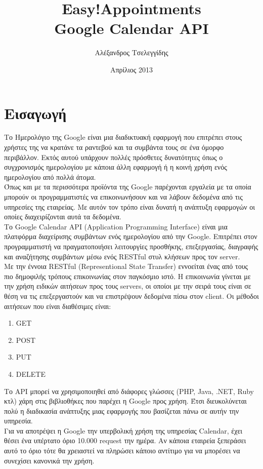 \documentclass[12pt]{article}
\title{{\Huge {\bf Easy!Appointments}} \\[0.3cm] Google Calendar API}
\author{Αλέξανδρος Τσελεγγίδης}
\date{Απρίλιος 2013}
\begin{document}
\maketitle 
\thispagestyle{empty} %

\section {Εισαγωγή}
Το Ημερολόγιο της Google είναι μια διαδικτυακή εφαρμογή που επιτρέπει στους χρήστες της να κρατάνε τα ραντεβού και τα συμβάντα τους σε ένα όμορφο περιβάλλον. Εκτός αυτού υπάρχουν πολλές πρόσθετες δυνατότητες όπως ο συγχρονισμός ημερολογίου με κάποια άλλη εφαρμογή ή η κοινή χρήση ενός ημερολογίου από πολλά άτομα.
\\[0.3cm]
Όπως και με τα περισσότερα προϊόντα της Google παρέχονται εργαλεία με τα οποία μπορούν οι προγραμματιστές να επικοινωνήσουν και να λάβουν δεδομένα από τις υπηρεσίες της εταιρείας. Με αυτόν τον τρόπο είναι δυνατή η ανάπτυξη εφαρμογών οι οποίες διαχειρίζονται αυτά τα δεδομένα.
\\[0.3cm]
Το Google Calendar API (Application Programming Interface) είναι μια πλατφόρμα διαχείρισης συμβάντων ενός ημερολογίου από την Google. Επιτρέπει στον προγραμματιστή να πραγματοποιήσει λειτουργίες προσθήκης, επεξεργασίας, διαγραφής και αναζήτησης συμβάντων μέσω ενός RESTful στυλ κλήσεων προς τον server.
\\[0.3cm]
Με την έννοια RESTful (Representional State Transfer)  εννοείται ένας από τους πιο δημοφιλής τρόπους επικοινωνίας στον παγκόσμιο ιστό. Η επικοινωνία γίνεται με την χρήση ειδικών αιτήσεων προς τους servers, οι οποίοι με την σειρά τους είναι σε θέση να τις επεξεργαστούν και να επιστρέψουν δεδομένα πίσω στον client. Οι μέθοδοι αιτήσεων που είναι διαθέσιμες είναι:
\begin{enumerate}
\item GET
\item POST
\item PUT
\item DELETE
\end{enumerate}

Το API μπορεί να χρησιμοποιηθεί από διάφορες γλώσσες (PHP, Java, .NET, Ruby κτλ) χάρη στις βιβλιοθήκες που παρέχει η Google προς χρήση. Έτσι διευκολύνεται πολύ η διαδικασία ανάπτυξης μιας εφαρμογής που βασίζεται πάνω σε αυτήν την υπηρεσία.
\\[0.3cm]
Για να αποτρέψει η Google την υπερβολική χρήση της υπηρεσίας Calendar, έχει θέσει ένα υπέρτατο όριο 10.000 request την ημέρα. Αν κάποια εταιρεία ξεπεράσει αυτό το όριο τότε θα χρειαστεί να πληρώσει κάποιο αντίτιμο για να μπορέσει να συνεχίσει κανονικά την χρήση.
\end{document}
